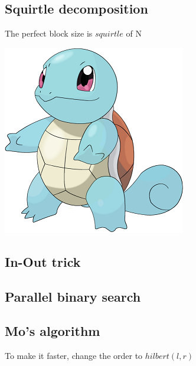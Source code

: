 \subsection{Squirtle decomposition}
\vspace{-18pt}
\begin{minipage}{70mm}
  The perfect block size is $squirtle$ of N
\end{minipage}
\begin{minipage}{15mm}
  \includegraphics[width=\linewidth]{squirtle.png} 
\end{minipage}
\vspace{-18pt}

\subsection{In-Out trick}

\subsection{Parallel binary search}

\subsection{Mo's algorithm}
To make it faster, change the order to $hilbert(l, r)$ \\

